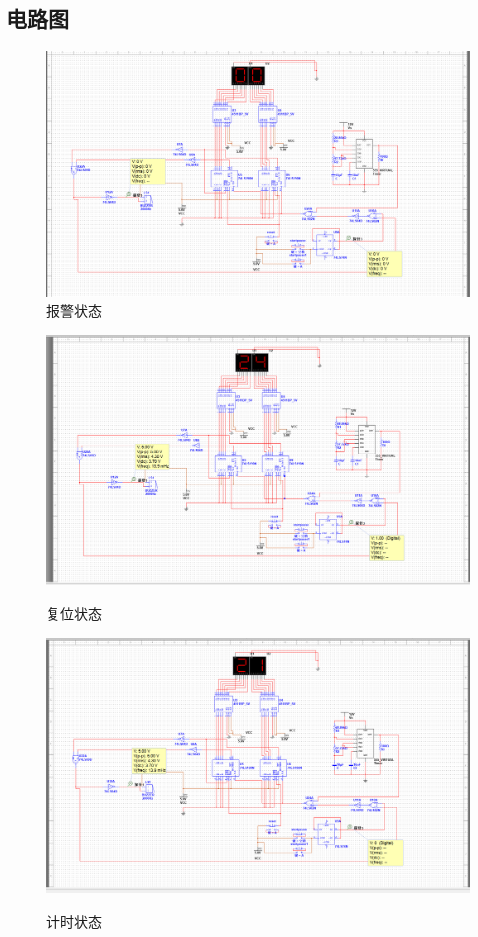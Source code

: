 \documentclass[12p,UTF8]{article}
\begin{document}
\begin{spacing}{1.25}
  \section{电路图}
  \begin{figure}[H]
    \centering 
    \label{电路图1}
    \includegraphics[width=1\textwidth]{1}
    \caption{报警状态}
    \label{电路图1}
    \end{figure}

  \begin{figure}[H]
    \centering  %
    \label{电路图2}
    \includegraphics[width=1\textwidth]{2}
    \caption{复位状态}
    \label{电路图2}
  \end{figure}

  \begin{figure}[H]
    \centering  %
    \label{电路图3}
    \includegraphics[width=1\textwidth]{3}
    \caption{计时状态}
    \label{电路图3}
  \end{figure}


\end{spacing}
\end{document}
